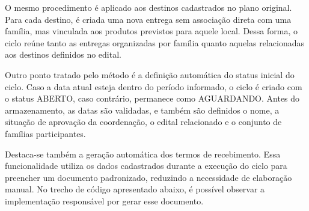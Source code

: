 O mesmo procedimento é aplicado aos destinos cadastrados no plano original. Para cada destino, é criada uma nova entrega sem associação direta com uma família, mas vinculada aos produtos previstos para aquele local. Dessa forma, o ciclo reúne tanto as entregas organizadas por família quanto aquelas relacionadas aos destinos definidos no edital.

Outro ponto tratado pelo método é a definição automática do status inicial do ciclo. Caso a data atual esteja dentro do período informado, o ciclo é criado com o status ABERTO, caso contrário, permanece como AGUARDANDO. Antes do armazenamento, as datas são validadas, e também são definidos o nome, a situação de aprovação da coordenação, o edital relacionado e o conjunto de famílias participantes.

Destaca-se também a geração automática dos termos de recebimento. Essa funcionalidade utiliza os dados cadastrados durante a execução do ciclo para preencher um documento padronizado, reduzindo a necessidade de elaboração manual. No trecho de código apresentado abaixo, é possível observar a implementação responsável por gerar esse documento.


